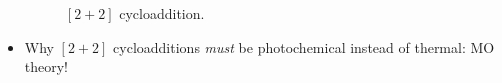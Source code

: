 \documentclass[../notes.tex]{subfiles}
\begin{document}
\begin{itemize}
\begin{figure}[H]
        \caption{$[2+2]$ cycloaddition.}
        \label{fig:22Cyclo}
    \end{figure}
    \item Why $[2+2]$ cycloadditions \emph{must} be photochemical instead of thermal: MO theory!
    \begin{figure}[h!]
        \centering
        \vspace{1em}
        \footnotesize
        \begin{subfigure}[b]{0.45\linewidth}
            \centering
\end{subfigure}
\end{figure}
\end{itemize}
\end{document}
